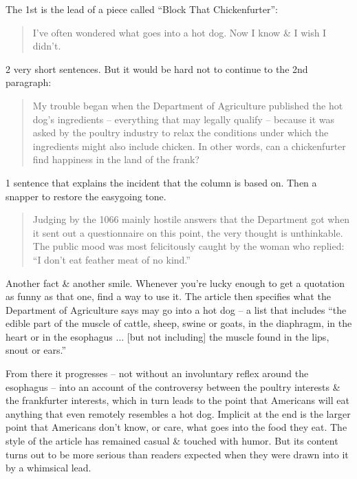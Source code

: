 \documentclass{article}
\begin{document}
The 1st is the lead of a piece called ``Block That Chickenfurter'':
\begin{quotation}
	I've often wondered what goes into a hot dog. Now I know \& I wish I didn't.
\end{quotation}
2 very short sentences. But it would be hard not to continue to the 2nd paragraph:
\begin{quotation}
	My trouble began when the Department of Agriculture published the hot dog's ingredients -- everything that may legally qualify -- because it was asked by the poultry industry to relax the conditions under which the ingredients might also include chicken. In other words, can a chickenfurter find happiness in the land of the frank?
\end{quotation}
1 sentence that explains the incident that the column is based on. Then a snapper to restore the easygoing tone.
\begin{quotation}
	Judging by the 1066 mainly hostile answers that the Department got when it sent out a questionnaire on this point, the very thought is unthinkable. The public mood was most felicitously caught by the woman who replied: ``I don't eat feather meat of no kind.''
\end{quotation}
Another fact \& another smile. Whenever you're lucky enough to get a quotation as funny as that one, find a way to use it. The article then specifies what the Department of Agriculture says may go into a hot dog -- a list that includes ``the edible part of the muscle of cattle, sheep, swine or goats, in the diaphragm, in the heart or in the esophagus $\ldots$ [but not including] the muscle found in the lips, snout or ears.''

From there it progresses -- not without an involuntary reflex around the esophagus -- into an account of the controversy between the poultry interests \& the frankfurter interests, which in turn leads to the point that Americans will eat anything that even remotely resembles a hot dog. Implicit at the end is the larger point that Americans don't know, or care, what goes into the food they eat. The style of the article has remained casual \& touched with humor. But its content turns out to be more serious than readers expected when they were drawn into it by a whimsical lead.
\end{document}
